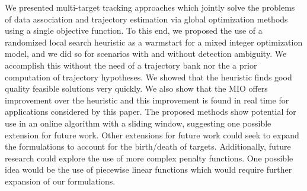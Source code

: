 We presented multi-target tracking approaches which jointly solve the problems of data association and trajectory estimation via global optimization methods using a single objective function. To this end, we proposed the use of a randomized local search heuristic as a warmstart for a mixed integer optimization model, and we did so for scenarios with and without detection ambiguity. We accomplish this without the need of a trajectory bank nor the a prior computation of trajectory hypotheses. We showed that the heuristic finds good quality feasible solutions very quickly. We also show that the MIO offers improvement over the heuristic and this improvement is found in real time for applications considered by this paper.  The proposed methods show potential for use in an online algorithm with a sliding window, suggesting one possible extension for future work. Other extensions for future work could seek to expand the formulations to account for the birth/death of targets. Additionally, future research could explore the use of more complex penalty functions. One possible idea would be the use of piecewise linear functions which would require further expansion of our formulations. 